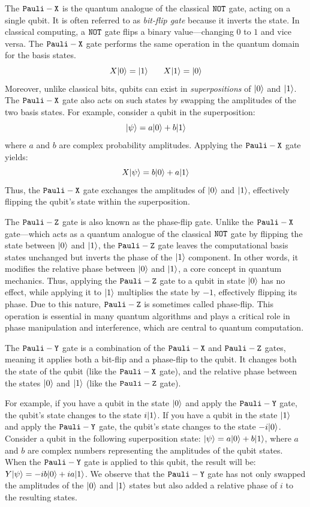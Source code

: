 The $\mathtt{Pauli-X}$ is the quantum analogue of the classical $\mathtt{NOT}$ gate, acting on a single qubit. 
%
It is often referred to as \emph{bit-flip gate} because it inverts the state.
%
In classical computing, a $\mathtt{NOT}$ gate flips a binary value—changing $0$ to $1$ and vice versa. 
%
The $\mathtt{Pauli-X}$ gate performs the same operation in the quantum domain for the basis states.
%
\[
X|0\rangle = |1\rangle\;\;\; \quad X|1\rangle = |0\rangle
\]
Moreover, unlike classical bits, qubits can exist in \emph{superpositions} of $|0\rangle$ and $|1\rangle$. The $\mathtt{Pauli-X}$ gate also acts on such states by swapping the amplitudes of the two basis states. For example, consider a qubit in the superposition:
%
\[
|\psi\rangle = a|0\rangle + b|1\rangle
\]
%
where $a$ and $b$ are complex probability amplitudes. Applying the $\mathtt{Pauli-X}$ gate yields:
%
\[
X|\psi\rangle = b|0\rangle + a|1\rangle
\]
%
Thus, the $\mathtt{Pauli-X}$ gate exchanges the amplitudes of $|0\rangle$ and $|1\rangle$, effectively flipping the qubit's state within the superposition.

The $\mathtt{Pauli-Z}$ gate is also known as the phase-flip gate. 
%
Unlike the $\mathtt{Pauli-X}$ gate—which acts as a quantum analogue of the classical $\mathtt{NOT}$ gate by flipping the state between $|0\rangle$ and $|1\rangle$, the $\mathtt{Pauli-Z}$ gate leaves the computational basis states unchanged but inverts the phase of the $|1\rangle$ component. In other words, it modifies the relative phase between $|0\rangle$ and $|1\rangle$, a core concept in quantum mechanics.
%
Thus, applying the $\mathtt{Pauli-Z}$ gate to a qubit in state $|0\rangle$ has no effect, while applying it to $|1\rangle$ multiplies the state by $-1$, effectively flipping its phase.
%
Due to this nature,  $\mathtt{Pauli-Z}$ is sometimes called phase-flip.
%
This operation is essential in many quantum algorithms and plays a critical role in phase manipulation and interference, which are central to quantum computation.

%
%
The $\mathtt{Pauli-Y}$ gate is a combination of the $\mathtt{Pauli-X}$ and $\mathtt{Pauli-Z}$ gates, meaning it applies both a bit-flip and a phase-flip to the qubit. 
%
It changes both the state of the qubit (like the $\mathtt{Pauli-X}$ gate), and the relative phase between the states $|0\rangle$ and $|1\rangle$ (like the $\mathtt{Pauli-Z}$ gate).

For example, if you have a qubit in the state $|0\rangle$ and apply the $\mathtt{Pauli-Y}$ gate, the qubit's state changes to the state $i|1\rangle$. 
%
If you have a qubit in the state $|1\rangle$ and apply the $\mathtt{Pauli-Y}$ gate, the qubit's state changes to the state $-i|0\rangle$.
%
Consider a qubit in the following superposition state:
$|\psi\rangle= a|0\rangle + b|1\rangle$, where $a$ and $b$ are complex numbers representing the amplitudes of the qubit states.
When the $\mathtt{Pauli-Y}$ gate is applied to this qubit, the result will be:
$Y|\psi\rangle = -i b|0\rangle + i a|1\rangle$.
%
We observe that the $\mathtt{Pauli-Y}$ gate has not only swapped the amplitudes of the $|0\rangle$ and $|1\rangle$ states but also added a relative phase of $i$ to the resulting states.

